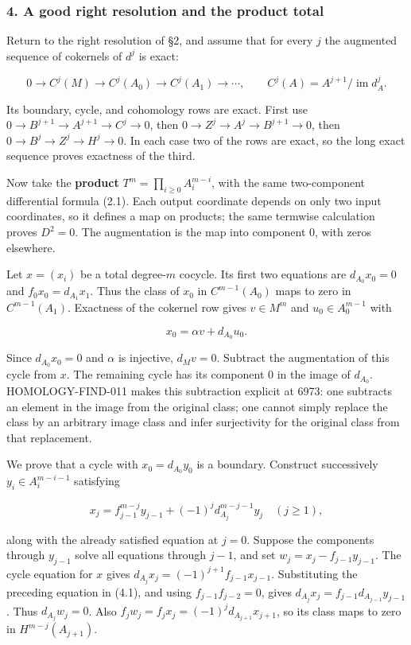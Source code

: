 \documentclass[11pt]{article}
\begin{document}
\subsubsection{4. A good right resolution and the product total}\label{a-good-right-resolution-and-the-product-total}

Return to the right resolution of §2, and assume that for every \(j\) the augmented sequence of cokernels of \(d^j\) is exact:

\[
0\to C^j(M)\to C^j(A_0)\to C^j(A_1)\to\cdots,
\qquad C^j(A)=A^{j+1}/\operatorname{im}d_A^j.
\]

Its boundary, cycle, and cohomology rows are exact. First use \(0\to B^{j+1}\to A^{j+1}\to C^j\to0\), then \(0\to Z^j\to A^j\to B^{j+1}\to0\), then \(0\to B^j\to Z^j\to H^j\to0\). In each case two of the rows are exact, so the long exact sequence proves exactness of the third.

Now take the \textbf{product} \(T^m=\prod_{i\geq0}A_i^{m-i}\), with the same two-component differential formula (2.1). Each output coordinate depends on only two input coordinates, so it defines a map on products; the same termwise calculation proves \(D^2=0\). The augmentation is the map into component 0, with zeros elsewhere.

Let \(x=(x_i)\) be a total degree-\(m\) cocycle. Its first two equations are \(d_{A_0}x_0=0\) and \(f_0x_0=d_{A_1}x_1\). Thus the class of \(x_0\) in \(C^{m-1}(A_0)\) maps to zero in \(C^{m-1}(A_1)\). Exactness of the cokernel row gives \(v\in M^m\) and \(u_0\in A_0^{m-1}\) with

\[
x_0=\alpha v+d_{A_0}u_0.
\]

Since \(d_{A_0}x_0=0\) and \(\alpha\) is injective, \(d_Mv=0\). Subtract the augmentation of this cycle from \(x\). The remaining cycle has its component 0 in the image of \(d_{A_0}\). HOMOLOGY-FIND-011 makes this subtraction explicit at 6973: one subtracts an element in the image from the original class; one cannot simply replace the class by an arbitrary image class and infer surjectivity for the original class from that replacement.

We prove that a cycle with \(x_0=d_{A_0}y_0\) is a boundary. Construct successively \(y_i\in A_i^{m-i-1}\) satisfying

\[
x_j=f_{j-1}^{m-j}y_{j-1}+(-1)^j d_{A_j}^{m-j-1}y_j
\quad (j\geq1),                             \tag{4.1}
\]

along with the already satisfied equation at \(j=0\). Suppose the components through \(y_{j-1}\) solve all equations through \(j-1\), and set \(w_j=x_j-f_{j-1}y_{j-1}\). The cycle equation for \(x\) gives \(d_{A_j}x_j=(-1)^{j+1}f_{j-1}x_{j-1}\). Substituting the preceding equation in (4.1), and using \(f_{j-1}f_{j-2}=0\), gives \(d_{A_j}x_j=f_{j-1}d_{A_{j-1}}y_{j-1}\). Thus \(d_{A_j}w_j=0\). Also \(f_jw_j=f_jx_j=(-1)^j d_{A_{j+1}}x_{j+1}\), so its class maps to zero in \(H^{m-j}(A_{j+1})\).
\end{document}
